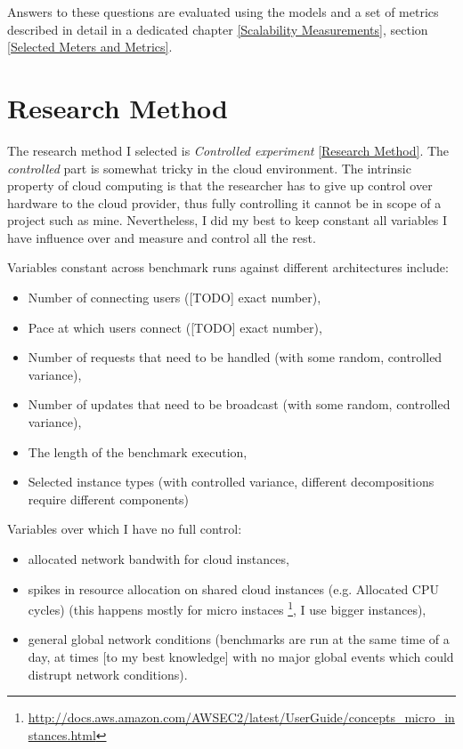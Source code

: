 \documentclass{uvamscse}
\begin{document}
Answers to these questions are evaluated using the models and a set of metrics described in detail in a dedicated chapter \ref{Scalability Measurements}, section \ref{Selected Meters and Metrics}.

\section{Research Method}
The research method I selected is \textit{Controlled experiment} \ref{Research Method}. The \textit{controlled} part is somewhat tricky in the cloud environment. The intrinsic property of cloud computing is that the researcher has to give up control over hardware to the cloud provider, thus fully controlling it cannot be in scope of a project such as mine. Nevertheless, I did my best to keep constant all variables I have influence over and measure and control all the rest.

Variables constant across benchmark runs against different architectures include:
\begin{itemize}
  \item Number of connecting users ([TODO] exact number),
  \item Pace at which users connect ([TODO] exact number),
  \item Number of requests that need to be handled (with some random, controlled variance),
  \item Number of updates that need to be broadcast (with some random, controlled variance),
  \item The length of the benchmark execution,
  \item Selected instance types (with controlled variance, different decompositions require different components)
\end{itemize}

Variables over which I have no full control:
\begin{itemize}
  \item allocated network bandwith for cloud instances,
  \item spikes in resource allocation on shared cloud instances (e.g. Allocated CPU cycles) (this happens mostly for micro instaces \footnote{\url{http://docs.aws.amazon.com/AWSEC2/latest/UserGuide/concepts\_micro\_instances.html}}, I use bigger instances),
  \item general global network conditions (benchmarks are run at the same time of a day, at times [to my best knowledge] with no major global events which could distrupt network conditions).
\end{itemize}
\end{document}
